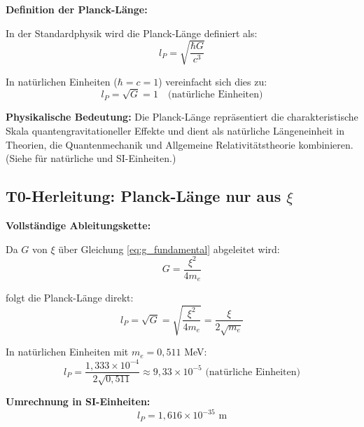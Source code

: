 	\begin{derivation}
		\textbf{Definition der Planck-Länge:}
		
		In der Standardphysik wird die Planck-Länge definiert als:
		\begin{equation}
			l_P = \sqrt{\frac{\hbar G}{c^3}}
			\label{eq:planck_length_standard}
		\end{equation}
		
		In natürlichen Einheiten ($\hbar = c = 1$) vereinfacht sich dies zu:
		\begin{equation}
			\boxed{l_P = \sqrt{G} = 1 \quad \text{(natürliche Einheiten)}}
			\label{eq:planck_natural}
		\end{equation}
		
		\textbf{Physikalische Bedeutung:} Die Planck-Länge repräsentiert die charakteristische Skala quantengravitationeller Effekte und dient als natürliche Längeneinheit in Theorien, die Quantenmechanik und Allgemeine Relativitätstheorie kombinieren. (Siehe \cite{T0_nat-si_De} für natürliche und SI-Einheiten.)
	\end{derivation}
	
	\subsection{T0-Herleitung: Planck-Länge nur aus $\xi$}
	
	\begin{keyresult}
		\textbf{Vollständige Ableitungskette:}
		
		Da $G$ von $\xi$ über Gleichung \eqref{eq:g_fundamental} abgeleitet wird:
		\begin{equation}
			G = \frac{\xi^2}{4 m_e}
		\end{equation}
		
		folgt die Planck-Länge direkt:
		\begin{equation}
			l_P = \sqrt{G} = \sqrt{\frac{\xi^2}{4 m_e}} = \frac{\xi}{2\sqrt{m_e}}
		\end{equation}
		
		In natürlichen Einheiten mit $m_e = 0{,}511$ MeV:
		\begin{equation}
			l_P = \frac{1{,}333 \times 10^{-4}}{2\sqrt{0{,}511}} \approx 9{,}33 \times 10^{-5} \text{ (natürliche Einheiten)}
		\end{equation}
		
		\textbf{Umrechnung in SI-Einheiten:}
		\begin{equation}
			\boxed{l_P = 1{,}616 \times 10^{-35} \text{ m}}
		\end{equation}
	\end{keyresult}
	
